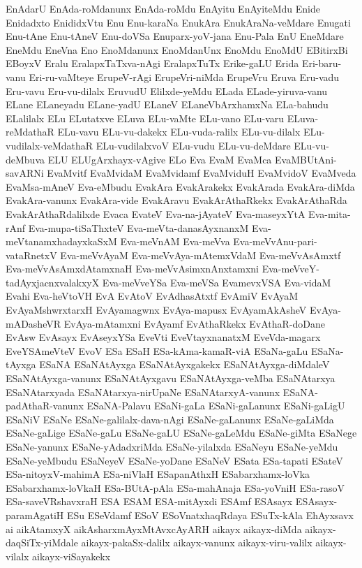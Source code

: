 {EnAdarU
EnAda-roMdanunx
EnAda-roMdu
EnAyitu
EnAyiteMdu
Enide
Enidadxto
EnididxVtu
Enu
Enu-karaNa
EnukAra
EnukAraNa-veMdare
Enugati
Enu-tAne
Enu-tAneV
Enu-doVSa
Enuparx-yoV-jana
Enu-Pala
EnU
EneMdare
EneMdu
EneVna
Eno
EnoMdanunx
EnoMdanUnx
EnoMdu
EnoMdU
EBitirxBi
EBoyxV
Eralu
EralapxTaTxva-nAgi
EralapxTuTx
Erike-gaLU
Erida
Eri-baru-vanu
Eri-ru-vaMteye
ErupeV-rAgi
ErupeVri-niMda
ErupeVru
Eruva
Eru-vadu
Eru-vavu
Eru-vu-dilalx
EruvudU
Elilxde-yeMdu
ELada
ELade-yiruva-vanu
ELane
ELaneyadu
ELane-yadU
ELaneV
ELaneVbArxhamxNa
ELa-bahudu
ELalilalx
ELu
ELutatxve
ELuva
ELu-vaMte
ELu-vano
ELu-varu
ELuva-reMdathaR
ELu-vavu
ELu-vu-dakekx
ELu-vuda-ralilx
ELu-vu-dilalx
ELu-vudilalx-veMdathaR
ELu-vudilalxvoV
ELu-vudu
ELu-vu-deMdare
ELu-vu-deMbuva
ELU
ELUgArxhayx-vAgive
ELo
Eva
EvaM
EvaMca
EvaMBUtAni-savARNi
EvaMvitf
EvaMvidaM
EvaMvidamf
EvaMviduH
EvaMvidoV
EvaMveda
EvaMsa-mAneV
Eva-eMbudu
EvakAra
EvakArakekx
EvakArada
EvakAra-diMda
EvakAra-vanunx
EvakAra-vide
EvakAravu
EvakArAthaRkekx
EvakArAthaRda
EvakArAthaRdalilxde
Evaca
EvateV
Eva-na-jAyateV
Eva-maseyxYtA
Eva-mita-rAnf
Eva-mupa-tiSaThxteV
Eva-meVta-danasAyxnanxM
Eva-meVtanamxhadayxkaSxM
Eva-meVnAM
Eva-meVva
Eva-meVvAnu-pari-vataRnetxV
Eva-meVvAyaM
Eva-meVvAya-mAtemxVdaM
Eva-meVvAsAmxtf
Eva-meVvAsAmxdAtamxnaH
Eva-meVvAsimxnAnxtamxni
Eva-meVveY-tadAyxjacnxvalakxyX
Eva-meVveYSa
Eva-meVSa
EvamevxVSA
Eva-vidaM
Evahi
Eva-heVtoVH
EvA
EvAtoV
EvAdhasAtxtf
EvAmiV
EvAyaM
EvAyaMshwrxtarxH
EvAyamagwnx
EvAya-mapusx
EvAyamAkAsheV
EvAya-mADasheVR
EvAya-mAtamxni
EvAyamf
EvAthaRkekx
EvAthaR-doDane
EvAsw
EvAsayx
EvAseyxYSa
EveVti
EveVtayxnanatxM
EveVda-magarx
EveYSAmeVteV
EvoV
ESa
ESaH
ESa-kAma-kamaR-viA
ESaNa-gaLu
ESaNa-tAyxga
ESaNA
ESaNAtAyxga
ESaNAtAyxgakekx
ESaNAtAyxga-diMdaleV
ESaNAtAyxga-vanunx
ESaNAtAyxgavu
ESaNAtAyxga-veMba
ESaNAtarxya
ESaNAtarxyada
ESaNAtarxya-nirUpaNe
ESaNAtarxyA-vanunx
ESaNA-padAthaR-vanunx
ESaNA-Palavu
ESaNi-gaLa
ESaNi-gaLanunx
ESaNi-gaLigU
ESaNiV
ESaNe
ESaNe-galilalx-dava-nAgi
ESaNe-gaLanunx
ESaNe-gaLiMda
ESaNe-gaLige
ESaNe-gaLu
ESaNe-gaLU
ESaNe-gaLeMdu
ESaNe-giMta
ESaNege
ESaNe-yanunx
ESaNe-yAdadxriMda
ESaNe-yilalxda
ESaNeyu
ESaNe-yeMdu
ESaNe-yeMbudu
ESaNeyeV
ESaNe-yoDane
ESaNeV
ESata
ESa-tapati
ESateV
ESa-nitoyxV-mahimA
ESa-niVlaH
ESapanAthxH
ESabarxhamx-loVka
ESabarxhamx-loVkaH
ESa-BUtA-pAla
ESa-mahAnaja
ESa-yoVniH
ESa-rasoV
ESa-saveVRshavxraH
ESA
ESAM
ESA-mitAyxdi
ESAmf
ESAsayx
ESAsayx-paramAgatiH
ESu
ESeVdamf
ESoV
ESoVnatxhaqRdaya
ESuTx-kAla
EhAyxsavx
ai
aikAtamxyX
aikAsharxmAyxMtAvxcAyARH
aikayx
aikayx-diMda
aikayx-daqSiTx-yiMdale
aikayx-pakaSx-dalilx
aikayx-vanunx
aikayx-viru-valilx
aikayx-vilalx
aikayx-viSayakekx
}
